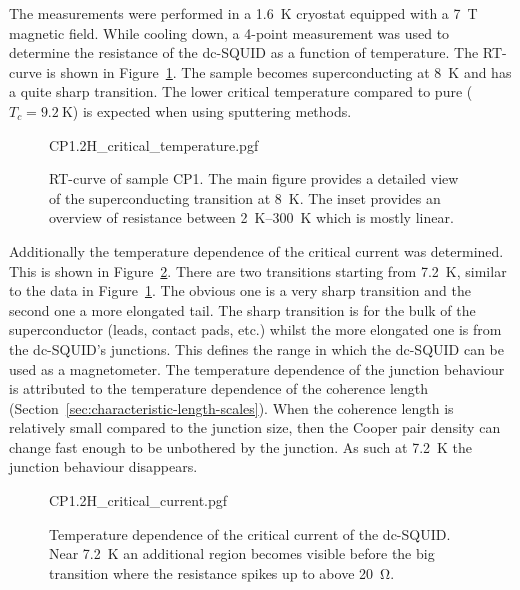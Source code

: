 The measurements were performed in a \qty{1.6}{\kelvin} cryostat equipped with a \qty{7}{\tesla} magnetic field. While cooling down, a 4-point measurement was used to determine the resistance of the dc-SQUID as a function of temperature. The RT-curve is shown in Figure~\ref{fig:CP1.2H-SQUID-RT}. The sample becomes superconducting at \qty{8}{\kelvin} and has a quite sharp transition. The lower critical temperature compared to pure  ($T_c=\qty{9.2}{\kelvin}$\cite{maxfieldSuperconductingPenetrationDepth1965}) is expected when using sputtering methods.

\begin{figure}[ht!]
	\centering
	{CP1.2H_critical_temperature.pgf}
	\caption{
		RT-curve of sample CP1. The main figure provides a detailed view of the superconducting transition at \qty{8}{\kelvin}. The inset provides an overview of resistance between \qtyrange{2}{300}{\kelvin} which is mostly linear.
	}
	\label{fig:CP1.2H-SQUID-RT}
\end{figure}

Additionally the temperature dependence of the critical current was determined. This is shown in Figure~\ref{fig:CP1.2H-SQUID-critical-current-temperature-dependence}. There are two transitions starting from \qty{7.2}{\kelvin}, similar to the data in Figure~\ref{fig:CP1.2H-SQUID-RT}. The obvious one is a very sharp transition and the second one a more elongated tail. The sharp transition is for the bulk of the superconductor (leads, contact pads, etc.) whilst the more elongated one is from the dc-SQUID's junctions. This defines the range in which the dc-SQUID can be used as a magnetometer. The temperature dependence of the junction behaviour is attributed to the temperature dependence of the coherence length (Section~\ref{sec:characteristic-length-scales}). When the coherence length is relatively small compared to the junction size, then the Cooper pair density can change fast enough to be unbothered by the junction. As such at \qty{7.2}{\kelvin} the junction behaviour disappears. 

\begin{figure}[ht!]
	\centering
	{CP1.2H_critical_current.pgf}
	\caption{Temperature dependence of the critical current of the dc-SQUID. Near \qty{7.2}{\kelvin} an additional region becomes visible before the big transition where the resistance spikes up to above \qty{20}{\ohm}.}
	\label{fig:CP1.2H-SQUID-critical-current-temperature-dependence}
\end{figure}

